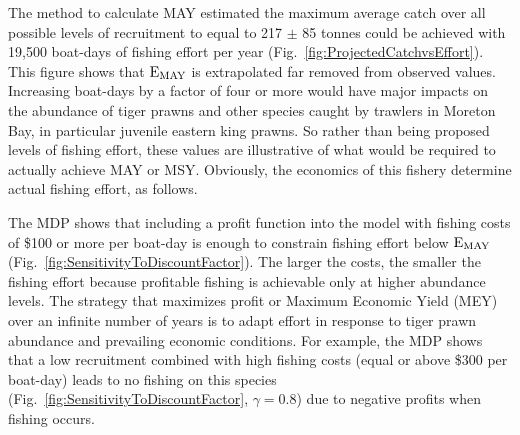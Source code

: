 The method to calculate MAY estimated the maximum average catch over all possible levels of recruitment to equal to 217 $\pm$ 85 tonnes could be achieved with 19,500 boat-days of fishing effort per year (Fig.~\ref{fig:ProjectedCatchvsEffort}). This figure shows that $\rm{E_{MAY}}$ is extrapolated far removed from observed values. Increasing boat-days by a factor of four or more would have major impacts on the abundance of tiger prawns and other species caught by trawlers in Moreton Bay, in particular juvenile eastern king prawns. So rather than being proposed levels of fishing effort, these values are illustrative of what would be required to actually achieve MAY or MSY. Obviously, the economics of this fishery determine actual fishing effort, as follows.

The MDP shows that including a profit function into the model with fishing costs of \$100 or more per boat-day is enough to constrain fishing effort below ${\rm E_{MAY}}$ (Fig.~\ref{fig:SensitivityToDiscountFactor}). The larger the costs, the smaller the fishing effort because profitable fishing is achievable only at higher abundance levels. The strategy that maximizes profit or Maximum Economic Yield (MEY) over an infinite number of years is to adapt effort in response to tiger prawn abundance and prevailing economic conditions. For example, the MDP shows that a low recruitment combined with high fishing costs (equal or above \$300 per boat-day) leads to no fishing on this species (Fig.~\ref{fig:SensitivityToDiscountFactor}, $\gamma=0.8$) due to negative profits when fishing occurs. 


